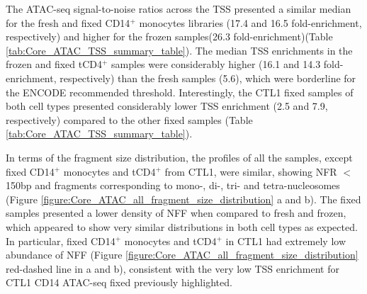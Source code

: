 The ATAC-seq signal-to-noise ratios across the TSS presented a similar median for the fresh and fixed CD14$^+$ monocytes libraries (17.4 and 16.5 fold-enrichment, respectively) and higher for the frozen samples(26.3 fold-enrichment)(Table \ref{tab:Core_ATAC_TSS_summary_table}). The median TSS enrichments in the frozen and fixed tCD4$^+$ samples were considerably higher (16.1 and 14.3 fold-enrichment, respectively) than the fresh samples (5.6), which were borderline for the ENCODE recommended threshold. Interestingly, the CTL1 fixed samples of both cell types presented considerably lower TSS enrichment (2.5 and 7.9, respectively) compared to the other fixed samples (Table \ref{tab:Core_ATAC_TSS_summary_table}). 


In terms of the fragment size distribution, the profiles of all the samples, except fixed CD14$^+$ monocytes and tCD4$^+$ from CTL1, were similar, showing NFR $<$150bp and fragments corresponding to mono-, di-, tri- and tetra-nucleosomes (Figure \ref{figure:Core_ATAC_all_fragment_size_distribution} a and b). The fixed samples presented a lower density of NFF when compared to fresh and frozen, which appeared to show very similar distributions in both cell types as expected. In particular, fixed CD14$^+$ monocytes and tCD4$^+$ in CTL1 had extremely low abundance of NFF (Figure \ref{figure:Core_ATAC_all_fragment_size_distribution} red-dashed line in a and b), consistent with the very low TSS enrichment for CTL1 CD14 ATAC-seq fixed previously highlighted. 

